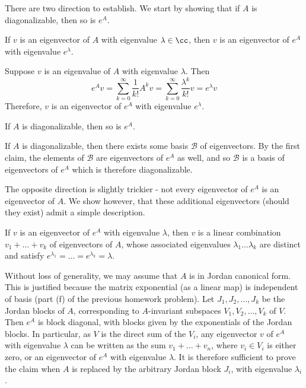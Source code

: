 \documentclass{scrartcl}
\begin{document}

\begin{solution} 
        There are two direction to establish. We start by showing that if $A$ is diagonalizable, then so is $e^A$.
        \begin{lemma}
        If $v$ is an eigenvector of $A$ with eigenvalue $\lambda\in \cc$, then $v$ is an eigenvector of $e^A$ with eigenvalue $e^\lambda$.
        \end{lemma}
        \begin{subproof}
        Suppose $v$ is an eigenvalue of $A$ with eigenvalue $\lambda$. Then 
        \[e^Av=\sum_{k=0}^{\infty}\frac{1}{k!}A^kv=\sum_{k=0}^{\infty}\frac{\lambda^k}{k!}v=e^\lambda v\]
        Therefore, $v$ is an eigenvector of $e^A$
         with eigenvalue $e^\lambda$.
         \end{subproof}
        
        \begin{lemma}
        If $A$ is diagonalizable, then so is $e^A$.
        \end{lemma}
        \begin{subproof}
        If $A$ is diagonalizable, then there exists some basis $\mathcal{B}$ of eigenvectors. By the first claim, the elements of $\mathcal{B}$ are eigenvectors of $e^A$ as well, and so $\mathcal{B}$ is a basis of eigenvectors of $e^A$ which is therefore diagonalizable.
        \end{subproof}
        
        The opposite direction is slightly trickier - not every eigenvector of $e^A$ is an eigenvector of $A$. We show however, that these additional eigenvectors (should they exist) admit a simple description. 
        
        \begin{lemma}
        If $v$ is an eigenvector of $e^A$ with eigenvalue $\lambda$, then $v$ is a linear combination $v_1+\dots +v_k$ of eigenvectors of $A$, whose associated eigenvalues $\lambda_1\dots \lambda_k$ are distinct and satisfy $e^{\lambda_1}=\dots=e^{\lambda_k}=\lambda$.
        \end{lemma}
            
        \begin{subproof}
        Without loss of generality, we may assume that $A$ is in Jordan canonical form. This is justified because the matrix exponential (as a linear map) is independent of basis (part (f) of the previous homework problem). Let $J_1,J_2,\dots, J_k$ be the Jordan blocks of $A$, corresponding to $A$-invariant subspaces $V_1,V_2,\dots, V_k$ of $V$. Then $e^A$ is block diagonal, with blocks given by the exponentials of the Jordan blocks. In particular, as $V$ is the direct sum of the $V_i$, any eigenvector $v$ of $e^A$ with eigenvalue $\lambda$ can be written as the sum $v_1+\dots + v_n$, where $v_i\in V_i$ is either zero, or an eigenvector of $e^A$ with eigenvalue $\lambda$. It is therefore sufficient to prove the claim when $A$ is replaced by the arbitrary Jordan block $J_i$, with eigenvalue $\lambda_i$.
        

\end{subproof}
\end{solution}
\end{document}
